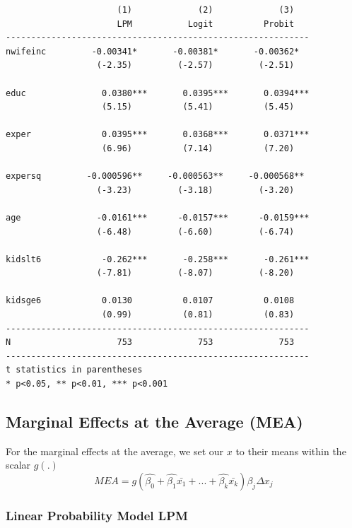 \documentclass[
]{book}
\begin{document}
\begin{verbatim}
                      (1)             (2)             (3)   
                      LPM           Logit          Probit   
------------------------------------------------------------
nwifeinc         -0.00341*       -0.00381*       -0.00362*  
                  (-2.35)         (-2.57)         (-2.51)   

educ               0.0380***       0.0395***       0.0394***
                   (5.15)          (5.41)          (5.45)   

exper              0.0395***       0.0368***       0.0371***
                   (6.96)          (7.14)          (7.20)   

expersq         -0.000596**     -0.000563**     -0.000568** 
                  (-3.23)         (-3.18)         (-3.20)   

age               -0.0161***      -0.0157***      -0.0159***
                  (-6.48)         (-6.60)         (-6.74)   

kidslt6            -0.262***       -0.258***       -0.261***
                  (-7.81)         (-8.07)         (-8.20)   

kidsge6            0.0130          0.0107          0.0108   
                   (0.99)          (0.81)          (0.83)   
------------------------------------------------------------
N                     753             753             753   
------------------------------------------------------------
t statistics in parentheses
* p<0.05, ** p<0.01, *** p<0.001
\end{verbatim}

\subsection*{Marginal Effects at the Average (MEA)}\label{marginal-effects-at-the-average-mea}

For the marginal effects at the average, we set our \(x\) to their means within the scalar \(g(.)\)
\[ MEA= g(\hat{\beta_0}+\hat{\beta_1} \bar{x_1} + ...+ \hat{\beta_k}\bar{x_k})\beta_j \Delta x_j \]

\subsubsection*{Linear Probability Model LPM}\label{linear-probability-model-lpm-1}
\end{document}
